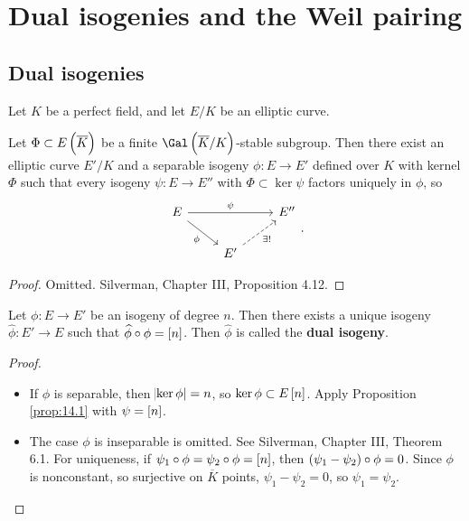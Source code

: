 \pagebreak

\section{Dual isogenies and the Weil pairing}

\subsection{Dual isogenies}

Let $ K $ be a perfect field, and let $ E / K $ be an elliptic curve.

\begin{proposition}
\label{prop:14.1}
Let $ \Phi \subset E\br{\overline{K}} $ be a finite $ \Gal\br{\overline{K} / K} $-stable subgroup. Then there exist an elliptic curve $ E' / K $ and a separable isogeny $ \phi : E \to E' $ defined over $ K $ with kernel $ \Phi $ such that every isogeny $ \psi : E \to E'' $ with $ \Phi \subset \ker \psi $ factors uniquely in $ \phi $, so
$$
\begin{tikzcd}
E \arrow{rr}{\psi} \arrow{dr}[swap]{\phi} & & E'' \\
& E' \arrow[dashed]{ur}[swap]{\exists !} &
\end{tikzcd}.
$$
\end{proposition}

\begin{proof}
Omitted. Silverman, Chapter III, Proposition 4.12.
\end{proof}

\begin{proposition}
Let $ \phi : E \to E' $ be an isogeny of degree $ n $. Then there exists a unique isogeny $ \widehat{\phi} : E' \to E $ such that $ \widehat{\phi} \circ \phi = \sbr{n} $. Then $ \widehat{\phi} $ is called the \textbf{dual isogeny}.
\end{proposition}

\begin{proof}
\hfill
\begin{itemize}
\item If $ \phi $ is separable, then $ \abs{\ker \phi} = n $, so $ \ker \phi \subset E\sbr{n} $. Apply Proposition \ref{prop:14.1} with $ \psi = \sbr{n} $.
\item The case $ \phi $ is inseparable is omitted. See Silverman, Chapter III, Theorem 6.1. For uniqueness, if $ \psi_1 \circ \phi = \psi_2 \circ \phi = \sbr{n} $, then $ \br{\psi_1 - \psi_2} \circ \phi = 0 $. Since $ \phi $ is nonconstant, so surjective on $ \overline{K} $ points, $ \psi_1 - \psi_2 = 0 $, so $ \psi_1 = \psi_2 $.
\end{itemize}
\end{proof}

